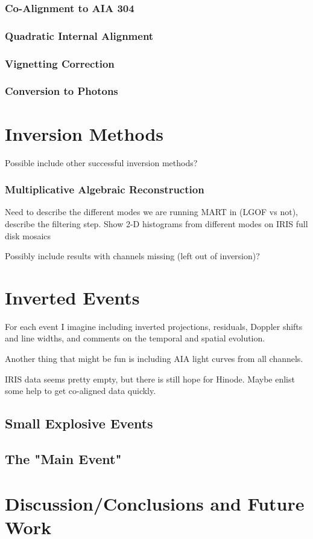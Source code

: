 \subsubsection{Co-Alignment to AIA 304}
\subsubsection{Quadratic Internal Alignment}
\subsubsection{Vignetting Correction}
\subsubsection{Conversion to Photons}


\section{Inversion Methods}

Possible include other successful inversion methods?

\subsubsection{Multiplicative Algebraic Reconstruction}
	Need to describe the different modes we are running MART in (LGOF vs not), describe the filtering step.  Show 2-D histograms from different modes on IRIS full disk mosaics
	
	Possibly include results with channels missing (left out of inversion)?

\section{Inverted Events}
	For each event I imagine including inverted projections, residuals, Doppler shifts and line widths, and comments on the temporal and spatial evolution.
	
	Another thing that might be fun is including AIA light curves from all channels.
	
	IRIS data seems pretty empty, but there is still hope for Hinode.  Maybe enlist some help to get co-aligned data quickly.
\subsection{Small Explosive Events}
\subsection{The "Main Event"}

\section{Discussion/Conclusions and Future Work}

